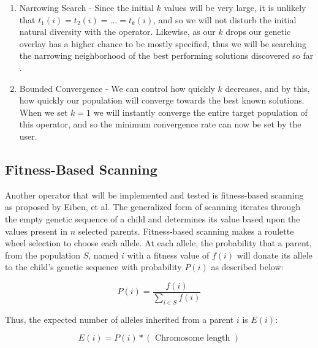 \begin{enumerate}

\item Narrowing Search - Since the initial $k$ values will be very large, it is unlikely that $t_1(i) = t_2(i) = \ldots = t_k(i)$, and so we will not disturb the initial natural diversity with the operator.  Likewise, as our $k$ drops our genetic overlay has a higher chance to be mostly specified, thus we will be searching the narrowing neighborhood of the best performing solutions discovered so far \cite{Neri11}.

\item Bounded Convergence - We can control how quickly $k$ decreases, and by this, how quickly our population will converge towards the best known solutions. When we set $k=1$ we will instantly converge the entire target population of this operator, and so the minimum convergence rate can now be set by the user.

\end{enumerate}

\subsection*{Fitness-Based Scanning}
Another operator that will be implemented and tested is fitness-based scanning as proposed by Eiben, et al\cite{Eiben94}. The generalized form of scanning iterates through the empty genetic sequence of a child and determines its value based upon the values present in $n$ selected parents\cite{Eiben91}. Fitness-based scanning makes a roulette wheel selection to choose each allele. At each allele, the probability that a parent, from the population $S$, named $i$ with a fitness value of $f(i)$ will donate its allele to the child's genetic sequence with probability $P(i)$ as described below\cite{Eiben94}: 

\[ P(i) = \frac{f(i)}{\sum\limits_{i \in S} f(i)} \]

\noindent Thus, the expected number of alleles inherited from a parent $i$ is $E(i)$\cite{Eiben94}:

\[ E(i) = P(i) *(\text{ Chromosome length }) \]

